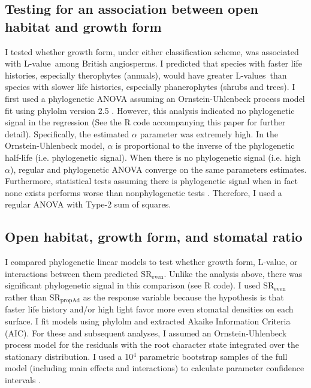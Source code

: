 \documentclass[12pt, oneside]{article}
\newcommand{\pkg}[1]{{\fontseries{b}\selectfont #1}}
\newcommand{\el}{L-value}
\newcommand{\els}{L-values}
\begin{document}
\subsection*{Testing for an association between open habitat and growth form}



I tested whether growth form, under either classification scheme, was associated with \el~among British angiosperms. I predicted that species with faster life histories, especially therophytes (annuals), would have greater \els~than species with slower life histories, especially phanerophytes (shrubs and trees). I first used a phylogenetic ANOVA assuming an Ornstein-Uhlenbeck process model fit using \pkg{phylolm} version 2.5 \citep{Ho_Ane_2014}. However, this analysis indicated no phylogenetic signal in the regression (See the R code accompanying this paper for further detail). Specifically, the estimated $\alpha$ parameter was extremely high. In the Ornstein-Uhlenbeck model, $\alpha$ is proportional to the inverse of the phylogenetic half-life (i.e. phylogenetic signal). When there is no phylogenetic signal (i.e. high $\alpha$), regular and phylogenetic ANOVA converge on the same parameters estimates. Furthermore, statistical tests assuming there is phylogenetic signal when in fact none exists performs worse than nonphylogenetic tests \citep{Revell_2010}. Therefore, I used a regular ANOVA with Type-2 sum of squares. 

\subsection*{Open habitat, growth form, and stomatal ratio}

I compared phylogenetic linear models to test whether growth form, \el, or interactions between them predicted $\textrm{SR}_\textrm{even}$. Unlike the analysis above, there was significant phylogenetic signal in this comparison (see R code). I used $\textrm{SR}_\textrm{even}$ rather than $\textrm{SR}_\textrm{propAd}$ as the response variable because the hypothesis is that faster life history and/or high light favor more even stomatal densities on each surface. I fit models using \pkg{phylolm} and extracted Akaike Information Criteria (AIC). For these and subsequent analyses, I assumed an Ornstein-Uhlenbeck process model for the residuals with the root character state integrated over the stationary distribution. I used a 10$^4$ parametric bootstrap samples of the full model (including main effects and interactions) to calculate parameter confidence intervals \citep{Boettiger_etal_2012}. %
\end{document}
